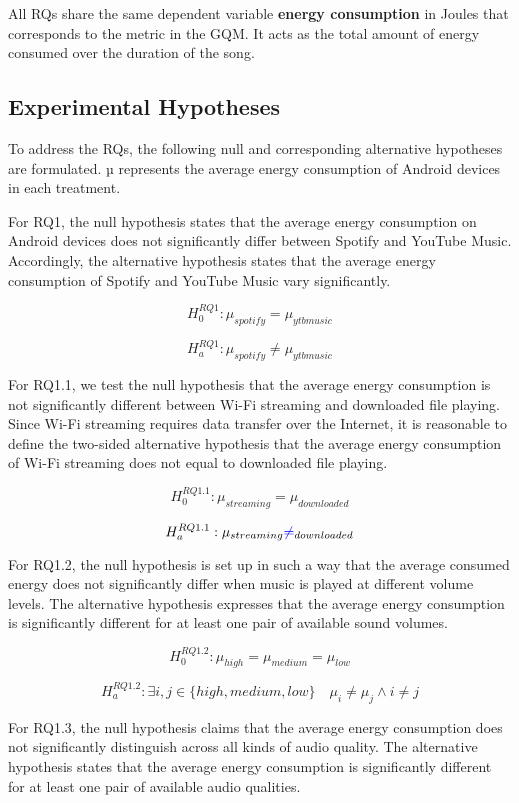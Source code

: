 All RQs share the same dependent variable \textbf{energy consumption} in Joules that corresponds to the metric in the GQM. It acts as the total amount of energy consumed over the duration of the song. 

\subsection{Experimental Hypotheses}
To address the RQs, the following null and corresponding alternative hypotheses are formulated. µ represents the average energy consumption of Android devices in each treatment.

For RQ1, the null hypothesis states that the average energy consumption on Android devices does not significantly differ between {\color{blue} Spotify and YouTube Music}. Accordingly, the alternative hypothesis states that the average energy consumption of {\color{blue} Spotify and YouTube Music} vary significantly. 

$$H_0^{RQ1}: \mu _{spotify} = \mu _{ytbmusic}$$

$$H_a^{RQ1}: \mu _{spotify} \ne \mu _{ytbmusic}$$

For RQ1.1, we test the null hypothesis that the average energy consumption is not significantly different between Wi-Fi streaming and downloaded file playing. {\color{blue}Since Wi-Fi streaming requires data transfer over the Internet, it is reasonable to define the two-sided alternative hypothesis that the average energy consumption of Wi-Fi streaming does not equal to downloaded file playing.} 


$$H_0^{RQ1.1}: \mu _{streaming} = \mu _{downloaded}$$

$$H_a^{RQ1.1}: \mu _{streaming} {\color{blue}\ne} _{downloaded}$$

{\color{blue}For RQ1.2, the null hypothesis is set up in such a way that the average consumed energy does not significantly differ when music is played at different volume levels. The alternative hypothesis expresses that the average energy consumption is significantly different for at least one pair of available sound volumes. 

$$H_0^{RQ1.2}: \mu _{high} = \mu _{medium} = \mu _{low}$$

$$H_a^{RQ1.2}: \exists i,j \in {\{high, medium, low\}} \quad \mu _{i} \ne \mu _{j} \wedge i \ne j$$
}
For RQ1.3, the null hypothesis claims that the average energy consumption does not significantly distinguish across all kinds of audio quality. The alternative hypothesis states that the average energy consumption is significantly different for at least one pair of available audio qualities. 


